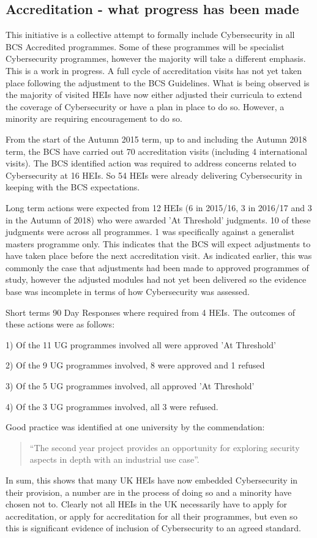 \documentclass[sigconf,anonymous]{acmart}
\begin{document}
\subsection{Accreditation - what progress has been made}

This initiative is a collective attempt to formally include Cybersecurity in all BCS Accredited programmes. Some of these programmes will be specialist Cybersecurity programmes, however the majority will take a different emphasis. This is a work in progress. A full cycle of accreditation visits has not yet taken place following the adjustment to the BCS Guidelines. What is being observed is the majority of visited HEIs have now either adjusted their curricula to extend the coverage of Cybersecurity or have a plan in place to do so. However, a minority are requiring encouragement to do so.

From the start of the Autumn 2015 term, up to and including the Autumn 2018 term, the BCS have carried out 70 accreditation visits (including 4 international visits). The BCS identified action was required to address concerns related to Cybersecurity at 16 HEIs. So 54 HEIs were already delivering Cybersecurity in keeping with the BCS expectations.

Long term actions were expected from 12 HEIs (6 in 2015/16, 3 in 2016/17 and 3 in the Autumn of 2018) who were awarded 'At Threshold' judgments. 10 of these judgments were across all programmes. 1 was specifically against a generalist masters programme only. This indicates that the BCS will expect adjustments to have taken place before the next accreditation visit. As indicated earlier, this was commonly the case that adjustments had been made to approved programmes of study, however the adjusted modules had not yet been delivered so the evidence base was incomplete in terms of how Cybersecurity was assessed.
 
Short terms 90 Day Responses where required from 4 HEIs. The outcomes of these actions were as follows:
                                                                        
1)	Of the 11 UG programmes involved all were approved 'At Threshold'

2)	Of the 9 UG programmes involved, 8 were approved and 1 refused

3)	Of the 5 UG programmes involved, all approved 'At Threshold'

4)	Of the 3 UG programmes involved, all 3 were refused.
 
Good practice was identified at one university by the commendation:
 \begin{quote}
``The second year project provides an opportunity for exploring security aspects in depth with an industrial use case''.
\end{quote}
In sum, this shows that many UK HEIs have now embedded Cybersecurity in their provision, a number are in the process of doing so and a minority have chosen not to. Clearly not all HEIs in the UK necessarily have to apply for accreditation, or apply for accreditation for all their programmes, but even so this is significant evidence of inclusion of Cybersecurity to an agreed standard.
\end{document}
